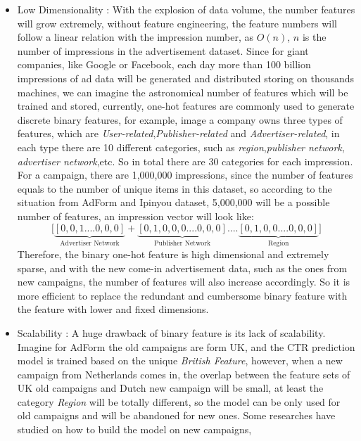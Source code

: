 \begin{itemize}
  \item Low Dimensionality : With the explosion of data volume, the number features will grow extremely, without feature engineering, the feature numbers will follow a linear relation with the impression number, as \(O(n)\), \(n\) is the number of impressions in the advertisement dataset. Since for giant companies, like Google or Facebook, each day more than 100 billion impressions of ad data will be generated and distributed storing on thousands machines, we can imagine the astronomical number of features which will be trained and stored, currently, one-hot features are commonly used to generate discrete binary features, for example, image a company owns three types of features, which are \textit{User-related},\textit{Publisher-related} and \textit{Advertiser-related}, in each type there are 10 different categories, such as \textit{region},\textit{publisher network}, \textit{advertiser network},etc. So in total there are 30 categories for each impression. For a campaign, there are 1,000,000 impressions, since the number of features equals to the number of unique items in this dataset, so according to the situation from AdForm and Ipinyou dataset, 5,000,000 will be a possible number of features, an impression vector will look like:
\begin{equation}
 \Big[\underbrace{[0,0,1....0,0,0]}_\textrm{Advertiser Network} + \underbrace{[0,1,0,0,0....0,0,0]}_\textrm{Publisher Network}.... \underbrace{[0,1,0,0....0,0,0]}_\textrm{Region}]
\end{equation}
Therefore, the binary one-hot feature is high dimensional and extremely sparse, and with the new come-in advertisement data, such as the ones from new campaigns, the number of features will also increase accordingly. So it is more efficient to replace the redundant and cumbersome binary feature with the feature with lower and fixed dimensions. 
    \item Scalability : A huge drawback of binary feature is its lack of scalability. Imagine for AdForm the old campaigns are form UK, and the CTR prediction model is trained based on the unique \textit{British Feature}, however, when a new campaign from Netherlands comes in, the overlap between the feature sets of UK old campaigns and Dutch new campaign will be small, at least the category \textit{Region} will be totally different, so the model can be only used for old campaigns and will be abandoned for new ones. Some researches have studied on how to build the model on new campaigns, 

\end{itemize}
